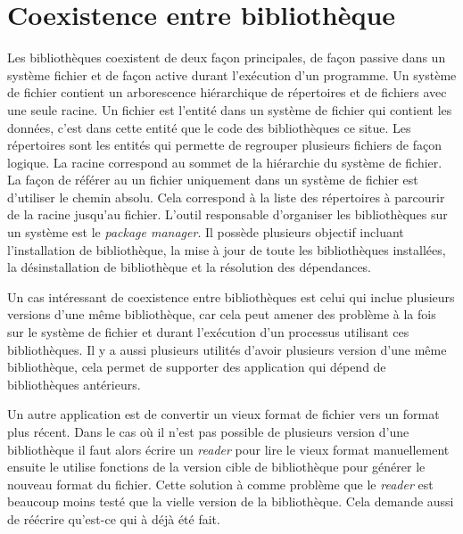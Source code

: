 
\section{Coexistence entre bibliothèque}
Les bibliothèques coexistent de deux façon principales, de façon passive dans
un système fichier et de façon active durant l'exécution d'un programme.  Un
système de fichier contient un arborescence hiérarchique de répertoires et de
fichiers avec une seule racine. Un fichier est l'entité dans un système de
fichier qui contient les données, c'est dans cette entité que le code des
bibliothèques ce situe.  Les répertoires sont les entités qui permette de
regrouper plusieurs fichiers de façon logique. La racine correspond au sommet
de la hiérarchie du système de fichier. La façon de référer au un fichier
uniquement dans un système de fichier est d'utiliser le chemin absolu. Cela
correspond à la liste des répertoires à parcourir de la racine jusqu'au
fichier. L'outil responsable d'organiser les bibliothèques sur un système
est le \textit{package manager}. Il possède plusieurs objectif incluant
l'installation de bibliothèque, la mise à jour de toute les bibliothèques
installées, la désinstallation de bibliothèque et la résolution des dépendances.

Un cas intéressant de coexistence entre bibliothèques est celui qui inclue
plusieurs versions d'une même bibliothèque, car cela peut amener des problème
à la fois sur le système de fichier et durant l'exécution d'un processus utilisant
ces bibliothèques. Il y a aussi plusieurs utilités d'avoir plusieurs version
d'une même bibliothèque, cela permet de supporter des application qui dépend de
bibliothèques antérieurs.

Un autre application est de convertir un vieux format de fichier vers un format
plus récent. Dans le cas où il n'est pas possible de plusieurs version d'une bibliothèque
il faut alors écrire un \textit{reader} pour lire le vieux format manuellement ensuite le
utilise fonctions de la version cible de bibliothèque pour générer le nouveau format du fichier.
Cette solution à comme problème que le \textit{reader} est beaucoup moins testé que la
vielle version de la bibliothèque. Cela demande aussi de réécrire qu'est-ce qui à déjà été fait.

